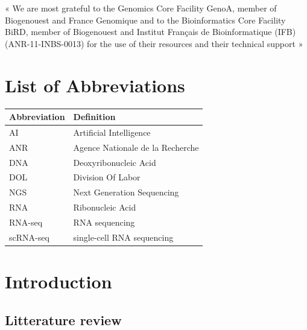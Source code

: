 \documentclass[
  11pt,
  a4paper,
]{report}
\renewcommand*\listfigurename{List of Figures}
\newcommand\listfigurename{List of Figures}
\renewcommand*\listtablename{List of Tables}
\newcommand\listtablename{List of Tables}
\begin{document}
« We are most grateful to the Genomics Core Facility GenoA, member of
Biogenouest and France Genomique and to the Bioinformatics Core Facility
BiRD, member of Biogenouest and Institut Français de Bioinformatique
(IFB) (ANR-11-INBS-0013) for the use of their resources and their
technical support »


\chapter*{List of Abbreviations}\label{list-of-abbreviations}


\begin{longtable}[]{@{}ll@{}}
\toprule\noalign{}
Abbreviation & Definition \\
\midrule\noalign{}
\endhead
\bottomrule\noalign{}
\endlastfoot
AI & Artificial Intelligence \\
ANR & Agence Nationale de la Recherche \\
DNA & Deoxyribonucleic Acid \\
DOL & Division Of Labor \\
NGS & Next Generation Sequencing \\
RNA & Ribonucleic Acid \\
RNA-seq & RNA sequencing \\
scRNA-seq & single-cell RNA sequencing \\
\end{longtable}

\renewcommand{\listfigurename}{List of Figures}
\renewcommand{\listtablename}{List of Tables}

\clearpage
{}
\listoffigures

\clearpage
{}
\listoftables

\clearpage{}\setcounter{page}{1}


\chapter{Introduction}\label{sec-intro}

\section{Litterature review}\label{litterature-review}
\end{document}

